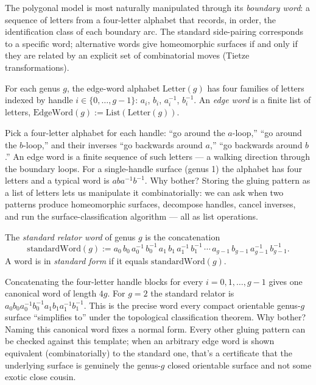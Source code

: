 The polygonal model is most naturally manipulated through its
\emph{boundary word}: a sequence of letters from a four-letter
alphabet that records, in order, the identification class of each
boundary arc. The standard side-pairing corresponds to a specific
word; alternative words give homeomorphic surfaces if and only if
they are related by an explicit set of combinatorial moves (Tietze
transformations).

\begin{definition}
\label{def:edge-word-alphabet}
For each genus \(g\), the edge-word alphabet \(\mathrm{Letter}(g)\)
has four families of letters indexed by handle \(i\in\{0,\ldots,g-1\}\):
\(a_i\), \(b_i\), \(a_i^{-1}\), \(b_i^{-1}\).
An \emph{edge word} is a finite list of letters,
\(\mathrm{EdgeWord}(g) := \mathrm{List}(\mathrm{Letter}(g))\).
\leanok
\end{definition}

\begin{layman}
Pick a four-letter alphabet for each handle: ``go around the
\(a\)-loop,'' ``go around the \(b\)-loop,'' and their inverses ``go
backwards around \(a\),'' ``go backwards around \(b\).'' An edge
word is a finite sequence of such letters — a walking direction
through the boundary loops. For a single-handle surface (genus 1)
the alphabet has four letters and a typical word is \(aba^{-1}b^{-1}\).
Why bother? Storing the gluing pattern as a list of letters lets us
manipulate it combinatorially: we can ask when two patterns produce
homeomorphic surfaces, decompose handles, cancel inverses, and run
the surface-classification algorithm — all as list operations.
\end{layman}

\begin{definition}
\label{def:standard-word}
The \emph{standard relator word} of genus \(g\) is the concatenation
\[
  \mathrm{standardWord}(g)
    := a_0\,b_0\,a_0^{-1}\,b_0^{-1}\,
       a_1\,b_1\,a_1^{-1}\,b_1^{-1}\,\cdots\,
       a_{g-1}\,b_{g-1}\,a_{g-1}^{-1}\,b_{g-1}^{-1}.
\]
A word is in \emph{standard form} if it equals
\(\mathrm{standardWord}(g)\).
\leanok
\end{definition}

\begin{layman}
Concatenating the four-letter handle blocks for every
\(i=0,1,\ldots,g-1\) gives one canonical word of length \(4g\). For
\(g=2\) the standard relator is \(a_0 b_0 a_0^{-1} b_0^{-1}
a_1 b_1 a_1^{-1} b_1^{-1}\). This is the precise word every compact
orientable genus-\(g\) surface ``simplifies to'' under the topological
classification theorem. Why bother? Naming this canonical word fixes
a normal form. Every other gluing pattern can be checked against
this template; when an arbitrary edge word is shown equivalent
(combinatorially) to the standard one, that's a certificate that the
underlying surface is genuinely the genus-\(g\) closed orientable
surface and not some exotic close cousin.
\end{layman}

